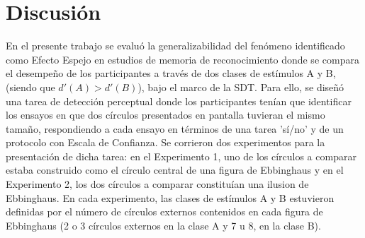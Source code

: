 
\chapter{Discusión} %

\label{Cap_Disc} %

En el presente trabajo se evaluó la generalizabilidad del fenómeno identificado como Efecto Espejo en estudios de memoria de reconocimiento donde se compara el desempeño de los participantes a través de dos clases de estímulos A y B, (siendo que $d'(A)>d'(B)$), bajo el marco de la SDT. Para ello, se diseñó una tarea de detección perceptual donde los participantes tenían que identificar los ensayos en que dos círculos presentados en pantalla tuvieran el mismo tamaño, respondiendo a cada ensayo en términos de una tarea 'sí/no' y de un protocolo con Escala de Confianza. Se corrieron dos experimentos para la presentación de dicha tarea: en el Experimento 1, uno de los círculos a comparar estaba construido como el círculo central de una figura de Ebbinghaus y en el Experimento 2, los dos círculos a comparar constituían una ilusion de Ebbinghaus. En cada experimento, las clases de estímulos A y B estuvieron definidas por el número de círculos externos contenidos en cada figura de Ebbinghaus (2 o 3 círculos externos en la clase A y 7 u 8, en la clase B).\\


